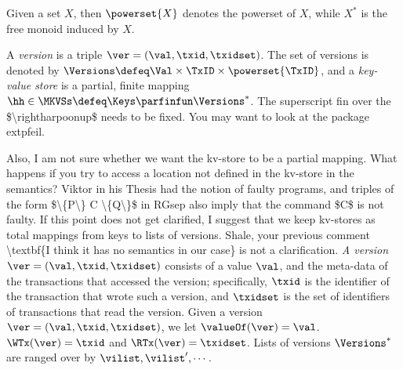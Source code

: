 Given a set $X$, then $\powerset{X}$ denotes 
the powerset of $X$, while $X^{\ast}$ is the free monoid induced by $X$.


\begin{definition}
\label{def:his_heap}
\label{def:mkvs}
A \emph{version} is a triple $\ver = (\val, \txid, \txidset)$. The set of versions is denoted by $\Versions \defeq \Val \times \TxID \times \powerset{\TxID}$, 
and a \emph{key-value store} is a partial, finite mapping $\hh \in \MKVSs \defeq \Keys \parfinfun \Versions^{\ast}$. 
\ac{ The superscript fin over the $\rightharpoonup$ needs to be fixed. You may want to look at the package extpfeil.}
\end{definition}
\ac{Also, I am not sure whether we want the kv-store to be a partial mapping. What happens if you try to access a location not 
defined in the kv-store in the semantics? Viktor in his Thesis had the notion of faulty programs, and triples of the form 
$\{P\} C \{Q\}$ in RGsep also imply that the command $C$ is not faulty. If this point  does not get clarified, 
I suggest that we keep kv-stores as total mappings from keys to lists of versions. Shale, 
your previous comment \textbf{I think it has no semantics in our case} is not a clarification.}
\emph{A version} $\ver = (\val, \txid, \txidset)$ consists of a value $\val$, and the meta-data of the transactions 
that accessed the version; specifically, $\txid$ is the identifier of the transaction that wrote such a version, 
and $\txidset$ is the set of identifiers of transactions that read the version.
Given a version $\ver = (\val, \txid, \txidset)$, we let $\valueOf(\ver) = \val$. 
$\WTx(\ver) = \txid$ and $\RTx(\ver) = \txidset$.
Lists of versions $\Versions^{\ast}$ are ranged over by $\vilist, \vilist',\cdots$.

